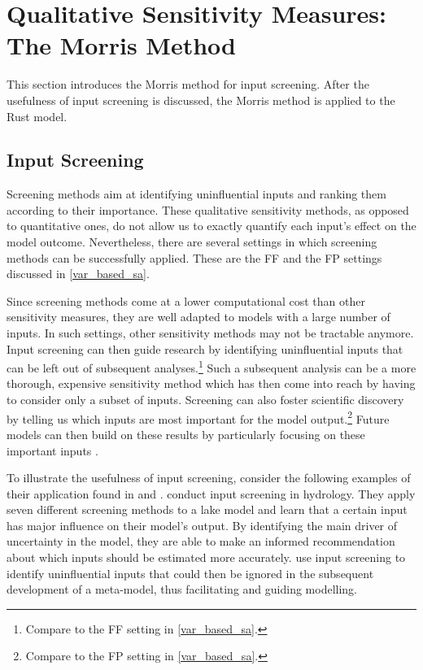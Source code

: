 \section{Qualitative Sensitivity Measures: The Morris Method} \label{comp_morris}

This section introduces the Morris method for input screening. After the usefulness of input screening is discussed, the Morris method is applied to the Rust model.

\subsection{Input Screening} \label{screening}

Screening methods aim at identifying uninfluential inputs and ranking them according to their importance. These qualitative sensitivity methods, as opposed to quantitative ones, do not allow us to exactly quantify each input's effect on the model outcome. Nevertheless, there are several settings in which screening methods can be successfully applied. These are the FF and the FP settings discussed in \cref{var_based_sa}.

Since screening methods come at a lower computational cost than other sensitivity measures, they are well adapted to models with a large number of inputs. In such settings, other sensitivity methods may not be tractable anymore. Input screening can then guide research by identifying uninfluential inputs that can be left out of subsequent analyses.\footnote{Compare to the FF setting in \cref{var_based_sa}.} Such a subsequent analysis can be a more thorough, expensive sensitivity method which has then come into reach by having to consider only a subset of inputs. Screening can also foster scientific discovery by telling us which inputs are most important for the model output.\footnote{Compare to the FP setting in \cref{var_based_sa}.} Future models can then build on these results by particularly focusing on these important inputs \citep{R21}.

To illustrate the usefulness of input screening, consider the following examples of their application found in \citet{GPWMS17} and \citet{MMA18}. \citet{GPWMS17} conduct input screening in hydrology. They apply seven different screening methods to a lake model and learn that a certain input has major influence on their model's output. By identifying the main driver of uncertainty in the model, they are able to make an informed recommendation about which inputs should be estimated more accurately. \citet{MMA18} use input screening to identify uninfluential inputs that could then be ignored in the subsequent development of a meta-model, thus facilitating and guiding modelling.

